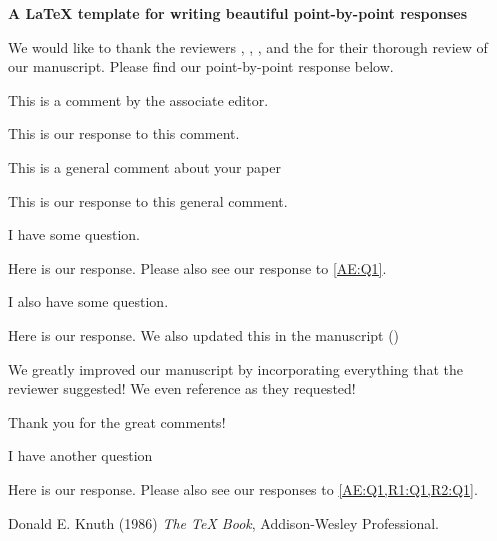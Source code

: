 \documentclass[11pt]{article}
\begin{document}
\begin{center}
\Large\bfseries A \LaTeX{} template for writing beautiful point-by-point responses
\end{center}

We would like to thank the reviewers , , , and the \revAE for their thorough review of our manuscript. Please find our point-by-point response below.

\begin{question}{}\label{AE:Q1}
This is a comment by the associate editor.
\end{question}

\begin{response}
This is our response to this comment.
\end{response}


\begin{question}{}\label{R1:general}
This is a general comment about your paper
\end{question}

\begin{response}
This is our response to this general comment.
\end{response}

\begin{question}{}\label{R1:Q1}
I have some question.
\end{question}

\begin{response}
Here is our response. Please also see our response to \cref{AE:Q1}.
\end{response}

\begin{question}{}\label{R2:Q1}
I also have some question.
\end{question}

\begin{response}
Here is our response. We also updated this in the manuscript (\addlines)
    \begin{revised}
    We greatly improved our manuscript by incorporating everything that the reviewer suggested! We even reference \cite{knuth1986} as they requested!
    \end{revised}
Thank you for the great comments!
\end{response}

\begin{question}{}\label{R2:Q2}
I have another question
\end{question}
\begin{response}
Here is our response. Please also see our responses to \cref{AE:Q1,R1:Q1,R2:Q1}.
\end{response}


\begin{thebibliography}{10}
Donald E. Knuth (1986) \emph{The \TeX{} Book}, Addison-Wesley Professional.
\end{thebibliography}
\end{document}
